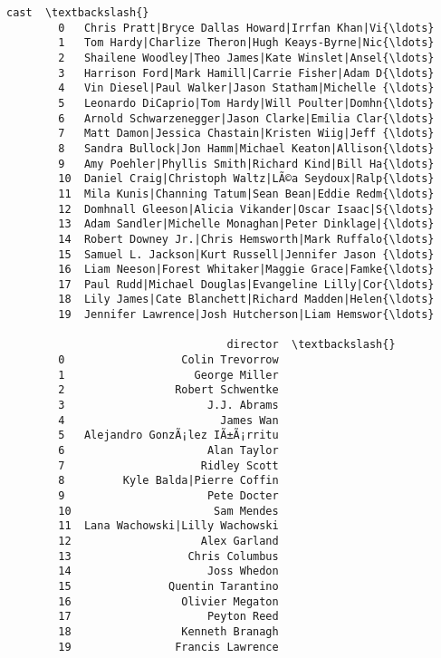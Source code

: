 \documentclass[11pt]{article}
\begin{document}
\begin{Verbatim}[commandchars=\\\{\}]
                                                         cast  \textbackslash{}
        0   Chris Pratt|Bryce Dallas Howard|Irrfan Khan|Vi{\ldots}   
        1   Tom Hardy|Charlize Theron|Hugh Keays-Byrne|Nic{\ldots}   
        2   Shailene Woodley|Theo James|Kate Winslet|Ansel{\ldots}   
        3   Harrison Ford|Mark Hamill|Carrie Fisher|Adam D{\ldots}   
        4   Vin Diesel|Paul Walker|Jason Statham|Michelle {\ldots}   
        5   Leonardo DiCaprio|Tom Hardy|Will Poulter|Domhn{\ldots}   
        6   Arnold Schwarzenegger|Jason Clarke|Emilia Clar{\ldots}   
        7   Matt Damon|Jessica Chastain|Kristen Wiig|Jeff {\ldots}   
        8   Sandra Bullock|Jon Hamm|Michael Keaton|Allison{\ldots}   
        9   Amy Poehler|Phyllis Smith|Richard Kind|Bill Ha{\ldots}   
        10  Daniel Craig|Christoph Waltz|LÃ©a Seydoux|Ralp{\ldots}   
        11  Mila Kunis|Channing Tatum|Sean Bean|Eddie Redm{\ldots}   
        12  Domhnall Gleeson|Alicia Vikander|Oscar Isaac|S{\ldots}   
        13  Adam Sandler|Michelle Monaghan|Peter Dinklage|{\ldots}   
        14  Robert Downey Jr.|Chris Hemsworth|Mark Ruffalo{\ldots}   
        15  Samuel L. Jackson|Kurt Russell|Jennifer Jason {\ldots}   
        16  Liam Neeson|Forest Whitaker|Maggie Grace|Famke{\ldots}   
        17  Paul Rudd|Michael Douglas|Evangeline Lilly|Cor{\ldots}   
        18  Lily James|Cate Blanchett|Richard Madden|Helen{\ldots}   
        19  Jennifer Lawrence|Josh Hutcherson|Liam Hemswor{\ldots}   
        
                                  director  \textbackslash{}
        0                  Colin Trevorrow   
        1                    George Miller   
        2                 Robert Schwentke   
        3                      J.J. Abrams   
        4                        James Wan   
        5   Alejandro GonzÃ¡lez IÃ±Ã¡rritu   
        6                      Alan Taylor   
        7                     Ridley Scott   
        8         Kyle Balda|Pierre Coffin   
        9                      Pete Docter   
        10                      Sam Mendes   
        11  Lana Wachowski|Lilly Wachowski   
        12                    Alex Garland   
        13                  Chris Columbus   
        14                     Joss Whedon   
        15               Quentin Tarantino   
        16                 Olivier Megaton   
        17                     Peyton Reed   
        18                 Kenneth Branagh   
        19                Francis Lawrence   
        

\end{Verbatim}
\end{document}
